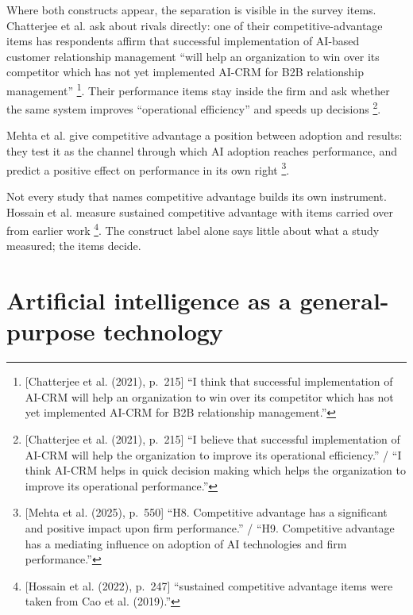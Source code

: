 Where both constructs appear, the separation is visible in the survey items.
Chatterjee et al. ask about rivals directly: one of their competitive-advantage items
has respondents affirm that successful implementation of AI-based customer relationship
management ``will help an organization to win over its competitor which has not yet
implemented AI-CRM for B2B relationship management'' \parencite[p.~215]{chatterjee2021effect}\footnote{[Chatterjee et al. (2021),
p.~215] ``I think that successful implementation of AI-CRM will help an organization
to win over its competitor which has not yet implemented AI-CRM for B2B relationship
management.''}. Their performance items stay inside the firm and ask whether the same
system improves ``operational efficiency'' and speeds up
decisions \parencite[p.~215]{chatterjee2021effect}\footnote{[Chatterjee et al. (2021),
p.~215] ``I believe that successful implementation of AI-CRM will help the organization
to improve its operational efficiency.'' / ``I think AI-CRM helps in quick decision
making which helps the organization to improve its operational performance.''}.

Mehta et al. give competitive advantage a position between adoption and results: they
test it as the channel through which AI adoption reaches performance, and predict a
positive effect on performance in its own
right \parencite[p.~550]{mehta2025driven}\footnote{[Mehta et al. (2025), p.~550]
``H8. Competitive advantage has a significant and positive impact upon firm
performance.'' / ``H9. Competitive advantage has a mediating influence on adoption of
AI technologies and firm performance.''}.

Not every study that names competitive advantage builds its own instrument. Hossain
et al. measure sustained competitive advantage with items carried over from earlier
work \parencite[p.~247]{hossain2022marketing}\footnote{[Hossain et al. (2022), p.~247]
``sustained competitive advantage items were taken from Cao et al. (2019).''}. The
construct label alone says little about what a study measured; the items decide.

\section{Artificial intelligence as a general-purpose technology}
\label{sec:gpt}

